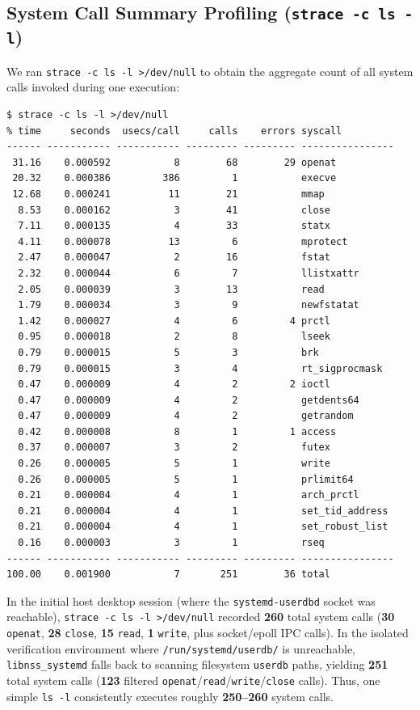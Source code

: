 \documentclass[12pt,a4paper]{article}
\begin{document}
\subsection{System Call Summary Profiling (\texttt{strace -c ls -l})}
We ran \texttt{strace -c ls -l >/dev/null} to obtain the aggregate count of all system calls invoked during one execution:
\begin{lstlisting}[style=consolestyle]
$ strace -c ls -l >/dev/null
% time     seconds  usecs/call     calls    errors syscall
------ ----------- ----------- --------- --------- ----------------
 31.16    0.000592           8        68        29 openat
 20.32    0.000386         386         1           execve
 12.68    0.000241          11        21           mmap
  8.53    0.000162           3        41           close
  7.11    0.000135           4        33           statx
  4.11    0.000078          13         6           mprotect
  2.47    0.000047           2        16           fstat
  2.32    0.000044           6         7           llistxattr
  2.05    0.000039           3        13           read
  1.79    0.000034           3         9           newfstatat
  1.42    0.000027           4         6         4 prctl
  0.95    0.000018           2         8           lseek
  0.79    0.000015           5         3           brk
  0.79    0.000015           3         4           rt_sigprocmask
  0.47    0.000009           4         2         2 ioctl
  0.47    0.000009           4         2           getdents64
  0.47    0.000009           4         2           getrandom
  0.42    0.000008           8         1         1 access
  0.37    0.000007           3         2           futex
  0.26    0.000005           5         1           write
  0.26    0.000005           5         1           prlimit64
  0.21    0.000004           4         1           arch_prctl
  0.21    0.000004           4         1           set_tid_address
  0.21    0.000004           4         1           set_robust_list
  0.16    0.000003           3         1           rseq
------ ----------- ----------- --------- --------- ----------------
100.00    0.001900           7       251        36 total
\end{lstlisting}

In the initial host desktop session (where the \texttt{systemd-userdbd} socket was reachable), \texttt{strace -c ls -l >/dev/null} recorded \textbf{260} total system calls (\textbf{30} \texttt{openat}, \textbf{28} \texttt{close}, \textbf{15} \texttt{read}, \textbf{1} \texttt{write}, plus socket/epoll IPC calls). In the isolated verification environment where \texttt{/run/systemd/userdb/} is unreachable, \texttt{libnss\_systemd} falls back to scanning filesystem \texttt{userdb} paths, yielding \textbf{251} total system calls (\textbf{123} filtered \texttt{openat}/\texttt{read}/\texttt{write}/\texttt{close} calls). Thus, one simple \texttt{ls -l} consistently executes roughly \textbf{250--260} system calls.
\end{document}
